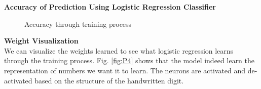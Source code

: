 \documentclass{article} %
\begin{document}
\textbf{Accuracy of Prediction Using Logistic Regression Classifier}\\

\begin{figure}%
	\centering
	\qquad
	\caption{Accuracy through training process}%
	\label{fig:P3}%
\end{figure}

\textbf{Weight Visualization}\\
We can visualize the weights learned to see what logistic regression learns through the training process. Fig. \ref{fig:P4} shows that the model indeed learn the representation of numbers we want it to learn. The neurons are activated and de-activated based on the structure of the handwritten digit.
\end{document}
